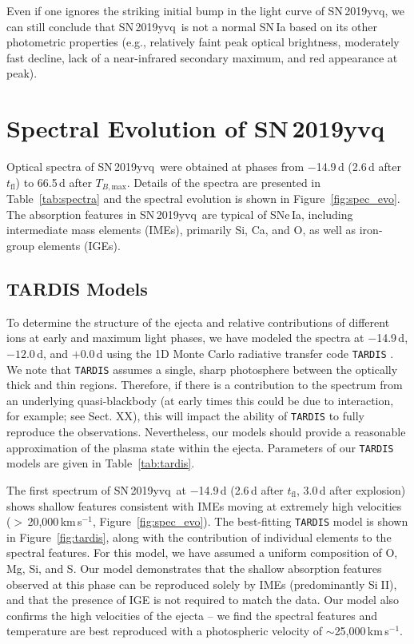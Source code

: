 \documentclass[twocolumn]{aastex63}
\def\ion#1#2{#1$\;${\footnotesize\rm{#2}}\relax}
\newcommand{\tfl}{$t_\mathrm{fl}$}
\newcommand{\tbmax}{$T_{B,\mathrm{max}}$}
\newcommand{\kms}{km\,s$^{-1}$}
\newcommand{\sn}{SN\,2019yvq}
\begin{document}
Even if one ignores the striking initial bump in the light curve of \sn, we
can still conclude that \sn\ is not a normal SN\,Ia based on its other
photometric properties (e.g., relatively faint peak optical brightness,
moderately fast decline, lack of a near-infrared secondary maximum, and red
appearance at peak).

\section{Spectral Evolution of \sn}\label{sec:spec}

Optical spectra of \sn\ were obtained at phases from $-$14.9\,d (2.6\,d after
\tfl) to 66.5\,d after \tbmax. Details of the spectra are presented in
Table~\ref{tab:spectra} and the spectral evolution is shown in
Figure~\ref{fig:spec_evo}. The absorption features in \sn\ are typical of
SNe\,Ia, including intermediate mass elements (IMEs), primarily Si, Ca, and O,
as well as iron-group elements (IGEs).

\subsection{TARDIS Models}\label{sec:tardis}

To determine the structure of the ejecta and relative contributions of
different ions at early and maximum light phases, we have modeled the spectra
at $-$14.9\,d, $-12.0$\,d, and $+$0.0\,d using the 1D Monte Carlo radiative
transfer code \texttt{TARDIS} \citep{Kerzendorf14}. We note that
\texttt{TARDIS} assumes a single, sharp photosphere between the optically
thick and thin regions. Therefore, if there is a contribution to the spectrum
from an underlying quasi-blackbody (at early times this could be due to
interaction, for example; see Sect. XX), this will impact the ability of
\texttt{TARDIS} to fully reproduce the observations. Nevertheless, our models
should provide a reasonable approximation of the plasma state within the
ejecta. Parameters of our \texttt{TARDIS} models are given in
Table~\ref{tab:tardis}.



The first spectrum of \sn\ at $-$14.9\,d (2.6\,d after \tfl, 3.0\,d after
explosion) shows shallow features consistent with IMEs moving at extremely
high velocities ($>$\,20,000\,\kms, Figure~\ref{fig:spec_evo}). The
best-fitting \texttt{TARDIS} model is shown in Figure~\ref{fig:tardis}, along
with the contribution of individual elements to the spectral features. For
this model, we have assumed a uniform composition of O, Mg, Si, and S. Our
model demonstrates that the shallow absorption features observed at this phase
can be reproduced solely by IMEs (predominantly \ion{Si}{II}), and that the
presence of IGE is not required to match the data. Our model also confirms the
high velocities of the ejecta -- we find the spectral features and temperature
are best reproduced with a photospheric velocity of
$\sim$25,000\,\kms.
\end{document}
